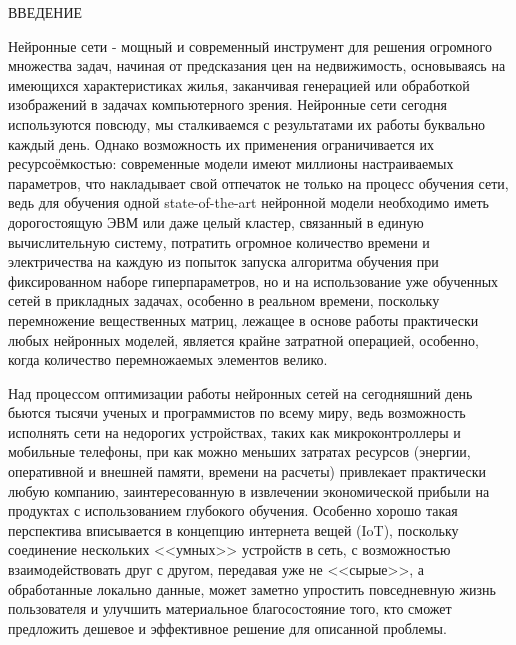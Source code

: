 \Introduction

\begin{center}
ВВЕДЕНИЕ
\end{center}

Нейронные  сети - мощный и современный инструмент для решения огромного множества задач, начиная от предсказания цен на недвижимость, основываясь на имеющихся характеристиках жилья, заканчивая генерацией или обработкой изображений в задачах компьютерного зрения. Нейронные сети сегодня используются повсюду, мы сталкиваемся с результатами их работы буквально каждый день. Однако возможность их применения ограничивается их ресурсоёмкостью: современные модели имеют миллионы настраиваемых параметров, что накладывает свой отпечаток не только на процесс обучения сети, ведь для обучения одной state-of-the-art нейронной модели необходимо иметь дорогостоящую ЭВМ или даже целый кластер, связанный в единую вычислительную систему, потратить огромное количество времени и электричества на каждую из попыток запуска алгоритма обучения при фиксированном наборе гиперпараметров, но и на использование уже обученных сетей в прикладных задачах, особенно в реальном времени, поскольку перемножение вещественных матриц, лежащее в основе работы практически любых нейронных моделей, является крайне затратной операцией, особенно, когда количество перемножаемых элементов велико.
 
Над процессом оптимизации работы нейронных сетей на сегодняшний день бьются тысячи ученых и программистов по всему миру, ведь возможность исполнять сети на недорогих устройствах, таких как микроконтроллеры и мобильные телефоны, при как можно меньших затратах ресурсов (энергии, оперативной и внешней памяти, времени на расчеты) привлекает практически любую компанию, заинтересованную в извлечении экономической прибыли на продуктах с использованием глубокого обучения. 
Особенно хорошо такая перспектива вписывается в концепцию интернета вещей (IoT), поскольку соединение нескольких <<умных>> устройств в сеть, с возможностью взаимодействовать друг с другом, передавая уже не <<сырые>>, а обработанные локально данные, может заметно упростить повседневную жизнь пользователя и улучшить материальное благосостояние того, кто сможет предложить дешевое и эффективное решение для описанной проблемы. 


